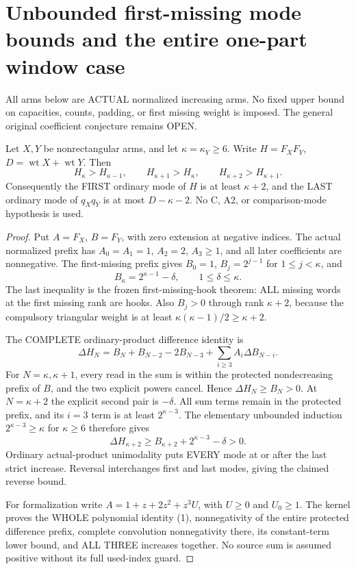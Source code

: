 \section{Unbounded first-missing mode bounds and the entire one-part window case}
All arms below are ACTUAL normalized increasing arms. No fixed
upper bound on capacities, counts, padding, or first missing weight
is imposed. The general original coefficient conjecture remains OPEN.

\begin{theorem}
Let $X,Y$ be nonrectangular arms, and let $\kappa=\kappa_Y\ge6$.
Write $H=F_XF_Y$, $D=\operatorname{wt}X+\operatorname{wt}Y$.
Then
\[
 H_\kappa>H_{\kappa-1},\qquad H_{\kappa+1}>H_\kappa,
 \qquad H_{\kappa+2}>H_{\kappa+1}.
\]
Consequently the FIRST ordinary mode of $H$ is at least $\kappa+2$,
and the LAST ordinary mode of $q_Xq_Y$ is at most $D-\kappa-2$.
No C, A2, or comparison-mode hypothesis is used.
\end{theorem}
\begin{proof}
Put $A=F_X$, $B=F_Y$, with zero extension at negative indices.
The actual normalized prefix has $A_0=A_1=1$, $A_2=2$,
$A_3\ge1$, and all later coefficients are nonnegative.
The first-missing prefix gives $B_0=1$, $B_j=2^{j-1}$ for
$1\le j<\kappa$, and
\[
 B_\kappa=2^{\kappa-1}-\delta,\qquad1\le\delta\le\kappa.
\]
The last inequality is the frozen first-missing-hook theorem: ALL
missing words at the first missing rank are hooks. Also $B_j>0$
through rank $\kappa+2$, because the compulsory triangular weight
is at least $\kappa(\kappa-1)/2\ge\kappa+2$.

The COMPLETE ordinary-product difference identity is
\[
 \Delta H_N=B_N+B_{N-2}-2B_{N-3}
                 +\sum_{i\ge3}A_i\Delta B_{N-i}.       \tag{1}
\]
For $N=\kappa,\kappa+1$, every read in the sum is within the
protected nondecreasing prefix of $B$, and the two explicit powers
cancel. Hence $\Delta H_N\ge B_N>0$.
At $N=\kappa+2$ the explicit second pair is $-\delta$.
All sum terms remain in the protected prefix, and its $i=3$ term
is at least $2^{\kappa-3}$. The elementary unbounded induction
$2^{\kappa-3}\ge\kappa$ for $\kappa\ge6$ therefore gives
\[
       \Delta H_{\kappa+2}\ge B_{\kappa+2}
                              +2^{\kappa-3}-\delta>0.  \tag{2}
\]
Ordinary actual-product unimodality puts EVERY mode at or after
the last strict increase. Reversal interchanges first and last
modes, giving the claimed reverse bound.

For formalization write $A=1+z+2z^2+z^3U$, with $U\ge0$ and
$U_0\ge1$. The kernel proves the WHOLE polynomial identity (1),
nonnegativity of the entire protected difference prefix, complete
convolution nonnegativity there, its constant-term lower bound,
and ALL THREE increases together. No source sum is assumed positive
without its full used-index guard.
\end{proof}

